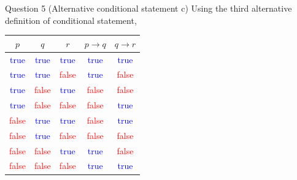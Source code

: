 \documentclass[10pt]{beamer}
\begin{document}
\begin{frame}[fragile]{Question 5 (Alternative conditional statement c)}
Using the third alternative definition of conditional statement,
\begin{table}
\centering
\begin{tabular}{|c|c|c|c|c|} 
\hline
 $p$                    & $q$                     & $r$                     & $p \rightarrow q$       & $q \rightarrow r$        \\ 
\hline
\textcolor{blue}{true}  & \textcolor{blue}{true}  & \textcolor{blue}{true}  & \textcolor{blue}{true}  & \textcolor{blue}{true}   \\ 
\hline
\textcolor{blue}{true}  & \textcolor{blue}{true}  & \textcolor{red}{false}  & \textcolor{blue}{true}  & \textcolor{red}{false}   \\ 
\hline
\textcolor{blue}{true}  & \textcolor{red}{false}  & \textcolor{blue}{true}  & \textcolor{red}{false}  & \textcolor{red}{false}   \\ 
\hline
\textcolor{blue}{true}  & \textcolor{red}{false}  & \textcolor{red}{false}  & \textcolor{red}{false}  & \textcolor{blue}{true}   \\ 
\hline
\textcolor{red}{false}  & \textcolor{blue}{true}  & \textcolor{blue}{true}  & \textcolor{red}{false}  & \textcolor{blue}{true}   \\ 
\hline
\textcolor{red}{false}  & \textcolor{blue}{true}  & \textcolor{red}{false}  & \textcolor{red}{false}  & \textcolor{red}{false}   \\ 
\hline
\textcolor{red}{false}  & \textcolor{red}{false}  & \textcolor{blue}{true}  & \textcolor{blue}{true}  & \textcolor{red}{false}   \\ 
\hline
\textcolor{red}{false}  & \textcolor{red}{false}  & \textcolor{red}{false}  & \textcolor{blue}{true}  & \textcolor{blue}{true}   \\
\hline
\end{tabular}
\end{table}
\end{frame}
\end{document}

